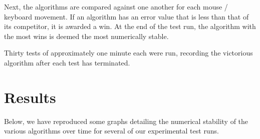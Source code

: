 \documentclass{acm_proc_article-sp}
\begin{document}
Next, the algorithms are compared against one another for each mouse / keyboard movement.
If an algorithm has an error value that is less than that of its competitor, it is awarded a win.
At the end of the test run, the algorithm with the most wins is deemed the most numerically stable.

Thirty tests of approximately one minute each were run, recording the victorious algorithm after each test has terminated.

\section{Results} 

Below, we have reproduced some graphs detailing the numerical stability of the various algorithms over time for several of our experimental test runs.
\end{document}
